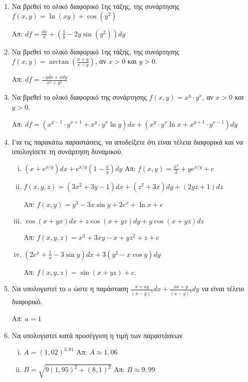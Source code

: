 \begin{enumerate}

    \item Να βρεθεί το ολικό διαφορικό 1ης τάξης, της συνάρτησης 
        $f(x,y)=\ln(xy)+\cos(y^2)$ 

        \hfill Απ: $df=\frac{dx}{x}+\left(\frac{1}{y}-2y\sin(y^2)\right)dy$

    \item Να βρεθεί το ολικό διαφορικό 1ης τάξης, της συνάρτησης 
        $ f(x,y) = \arctan(\frac{ x+y }{ x-y }) $, αν $ x>0 $ και $ y>0 $.

        \hfill Απ: $df = \frac{ -ydx + xdy }{ x^{2} + y^{2} } $ 

    \item Να βρεθεί το ολικό διαφορικό της συνάρτησης $ f(x,y) = x^{y} \cdot y^{x} $, 
        αν $ x>0$ και $ y>0 $.

        \hfill Απ: $df =  (x^{y-1}\cdot y^{x+1} + x^{y}\cdot y^{x} \ln{y} )dx 
        + (x^{y}\cdot y^{x} \ln{x} + x^{y+1} \cdot y^{x-1})dy $ 

    \item Για τις παρακάτω παραστάσεις, να αποδείξετε ότι είναι τέλεια διαφορικά και 
        να υπολογίσετε τη συνάρτηση δυναμικού.
        \begin{enumerate}[i)]
            \item $ \left(x+e^{x/y}\right)dx + e^{x/y}\left(1- \frac{x}{y}\right)dy $
                \hfill Απ: $ f(x,y) = \frac{x^{2}}{2} +y e^{x/y} + c $ 
            \item $ f(x,y,z) = (3x^{2}+3y-1)dx + (z^{2}+3x)dy+(2yz+1)dz $

                \hfill Απ: $f(x,y)=y^{3}-3x\sin y+2e^{x}+\ln x+c$
            \item $ \cos{(x+yx)} dx + z \cos{(x+yz)} dy + y \cos{(x+yz)} dz $  

                \hfill Απ: $ f(x,y,z) = x^{3}+3xy-x+yz^{2}+z+c $ 
            \item $\left(2e^{x}+\frac{1}{x}-3\sin y\right)dx+3(y^2-x\cos y)dy$ 

                \hfill  Απ: $ f(x,y,z) = \sin{(x+yz)} +c $.
        \end{enumerate}

    \item Να υπολογιστεί το $a$ ώστε η παράσταση $ \frac{ x + ay }{ (x-y)^{3} }dx 
        + \frac{ ax+y }{ (x-y)^{3} }dy $ να είναι τέλειο διαφορικό.

        \hfill Απ: $ a=1 $

    \item Να υπολογιστεί κατά προσέγγιση η τιμή των παραστάσεων
        \begin{enumerate}[i)]
            \item $A = (1,02)^{3,01} $ \hfill Απ: $ A \approx 1,06 $ 
            \item $B =  \sqrt{ 9(1,95)^{2} + (8,1)^{2} } $ 
                \hfill Απ: $ B \approx 9,99 $ 
        \end{enumerate}	

\end{enumerate}


